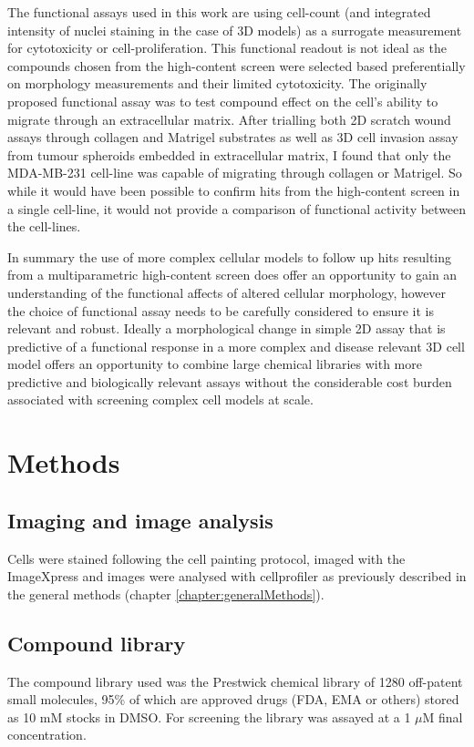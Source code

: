 \documentclass[a4paper,11pt,twoside,openright]{scrbook}
\begin{document}
The functional assays used in this work are using cell-count (and integrated intensity of nuclei staining in the case 
of 3D models) as a surrogate measurement for cytotoxicity or cell-proliferation.
This functional readout is not ideal as the compounds chosen from the high-content screen were selected based 
preferentially on morphology measurements and their limited cytotoxicity.
The originally proposed functional assay was to test compound effect on the cell's ability to migrate through an 
extracellular matrix.
After trialling both 2D scratch wound assays through collagen and Matrigel substrates as well as 3D cell invasion assay 
from tumour spheroids embedded in extracellular matrix, I found that only the MDA-MB-231 cell-line was capable of 
migrating through collagen or Matrigel.
So while it would have been possible to confirm hits from the high-content screen in a single cell-line, it would not 
provide a comparison of functional activity between the cell-lines.

In summary the use of more complex cellular models to follow up hits resulting from a multiparametric high-content 
screen does offer an opportunity to gain an understanding of the functional affects of altered cellular morphology, 
however the choice of functional assay needs to be carefully considered to ensure it is relevant and robust.
Ideally a morphological change in simple 2D assay that is predictive of a functional response in a more complex and 
disease relevant 3D cell model offers an opportunity to combine large chemical libraries with more predictive and 
biologically relevant assays without the considerable cost burden associated with screening complex cell models at 
scale.




\section{Methods}

\subsection{Imaging and image analysis}
Cells were stained following the cell painting protocol, imaged with the ImageXpress and images were analysed with 
cellprofiler as previously described in the general methods (chapter \ref{chapter:generalMethods}).


\subsection{Compound library}
The compound library used was the Prestwick chemical library of 1280 off-patent small molecules, 95\% of which are 
approved drugs (FDA, EMA or others) stored as 10 mM stocks in DMSO.
For screening the library was assayed at a 1 $\mu$M final concentration.
\end{document}
